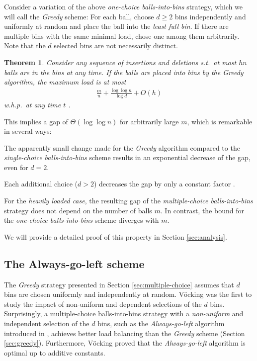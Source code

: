 \documentclass[a4paper,12pt]{article}
\newcommand\todo[1]{\textcolor{red}{(TODO: #1)}}
\newtheorem{theorem}{Theorem}
\begin{document}
Consider a variation of the above \emph{one-choice balls-into-bins} strategy, which we will call the \emph{Greedy} scheme: For each ball, choose $d \geq 2$ bins independently and uniformly at random and place the ball into the \emph{least full bin}. If there are multiple bins with the same minimal load, chose one among them arbitrarily. Note that the $d$ selected bins are not necessarily distinct. 

\begin{theorem}
\label{theorem:greedy}
Consider any sequence of insertions and deletions s.t.~at most $hn$ balls are in the bins at any time. If the balls are placed into bins by the Greedy algorithm, the maximum load is at most 
\begin{align*}
\frac{m}{n} + \frac{\log \log n}{\log d}+ O(h)
\end{align*}
w.h.p.~at any time $t$ \cite{ABKU99} \cite{BCSV06}.
\end{theorem}

This implies a gap of $\Theta\left(\log \log n \right)$ for arbitrarily large $m$, which is remarkable in several ways:
\begin{compactitem}
\item The apparently small change made for the \emph{Greedy} algorithm compared to the \emph{single-choice balls-into-bins} scheme results in an exponential decrease of the gap, even for $d=2$. 
\item Each additional choice ($d > 2$) decreases the gap by only a constant factor \cite{MRS01}. 
\item For the \emph{heavily loaded case}, the resulting gap of the \emph{multiple-choice balls-into-bins} strategy does not depend on the number of balls $m$. In contrast, the bound for the \emph{one-choice balls-into-bins} scheme diverges with $m$.
\begin{comment}
\todo{the following is only true for class 1 algorithms}
\item The given bounds are \emph{tight}, meaning that no other strategy that places each ball into one of $d$ randomly selected bins achieves a gap that is asymptotically lower.
\end{comment}
\end{compactitem}

We will provide a detailed proof of this property in Section \ref{sec:analysis}.

\subsection{The Always-go-left scheme}
\label{sec:AlwaysGoLeft}
The \emph{Greedy} strategy presented in Section \ref{sec:multiple-choice} assumes that $d$ bins are chosen uniformly and independently at random. V\"ocking \cite{VOC03} was the first to study the impact of non-uniform and dependent selections of the $d$ bins. Surprisingly, a multiple-choice balls-into-bins strategy with a \emph{non-uniform} and independent selection of the $d$ bins, such as the \emph{Always-go-left} algorithm introduced in \cite{VOC03}, achieves better \cite{BCSV06} load balancing than the \emph{Greedy} scheme (Section \ref{sec:greedy}). Furthermore, V\"ocking proved that the \emph{Always-go-left} algorithm is optimal up to additive constants.
\end{document}
